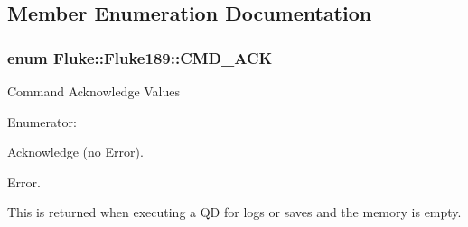 \subsection{Member Enumeration Documentation}
\hypertarget{classFluke_1_1Fluke189_a1dc3e71946821b69a497313c15a563d6}{
\subsubsection[{CMD\_\-ACK}]{\setlength{\rightskip}{0pt plus 5cm}enum {\bf Fluke::Fluke189::CMD\_\-ACK}}}
\label{classFluke_1_1Fluke189_a1dc3e71946821b69a497313c15a563d6}
Command Acknowledge Values \begin{Desc}
\item[Enumerator: ]\par
\begin{description}
\item[{\em 
\hypertarget{classFluke_1_1Fluke189_a1dc3e71946821b69a497313c15a563d6adfe46b4cef1f6ea04b2f3b0abee5092c}{
CA\_\-ERR\_\-ACK}
\label{classFluke_1_1Fluke189_a1dc3e71946821b69a497313c15a563d6adfe46b4cef1f6ea04b2f3b0abee5092c}
}]Acknowledge (no Error). \item[{\em 
\hypertarget{classFluke_1_1Fluke189_a1dc3e71946821b69a497313c15a563d6ac157cd20279d9b6cba70f8da4ffbeb35}{
CA\_\-ERR\_\-FAIL}
\label{classFluke_1_1Fluke189_a1dc3e71946821b69a497313c15a563d6ac157cd20279d9b6cba70f8da4ffbeb35}
}]Error. \item[{\em 
\hypertarget{classFluke_1_1Fluke189_a1dc3e71946821b69a497313c15a563d6aeb64e037c0e59e7577ba976ee3b25a20}{
CA\_\-ERR\_\-NODATA}
\label{classFluke_1_1Fluke189_a1dc3e71946821b69a497313c15a563d6aeb64e037c0e59e7577ba976ee3b25a20}
}]This is returned when executing a QD for logs or saves and the memory is empty. \end{description}
\end{Desc}


